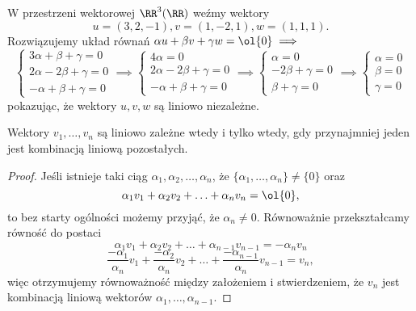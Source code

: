 \begin{example}
    W przestrzeni wektorowej $\RR^3(\RR)$ weźmy wektory
    $$ u = (3, 2, -1), v = (1, -2, 1), w = (1, 1, 1). $$
    Rozwiązujemy układ równań $\alpha u + \beta v + \gamma w = \ol{0} \implies$
    \begin{equation*}
        \begin{cases}
            3\alpha + \beta + \gamma = 0 \\
            2\alpha - 2\beta + \gamma = 0 \\
            -\alpha + \beta + \gamma = 0
        \end{cases} \implies
        \begin{cases}
            4\alpha = 0 \\
            2\alpha - 2\beta + \gamma = 0 \\
            -\alpha + \beta + \gamma = 0
        \end{cases} \implies
        \begin{cases}
            \alpha = 0 \\
            - 2\beta + \gamma = 0 \\
            \beta + \gamma = 0
        \end{cases} \implies
        \begin{cases}
            \alpha = 0 \\
            \beta = 0 \\
            \gamma = 0
        \end{cases}
    \end{equation*}
    pokazując, że wektory $u, v, w$ są liniowo niezależne.
\end{example}

\begin{theorem}
    Wektory $v_1, \ldots, v_n$ są liniowo zależne wtedy i tylko wtedy, gdy przynajmniej jeden jest kombinacją liniową pozostałych.
\end{theorem}
\begin{proof}
    Jeśli istnieje taki ciąg $\alpha_1, \alpha_2, \ldots, \alpha_n$, że $\{\alpha_1, \ldots, \alpha_n\} \neq \{0\}$ oraz
    $$ \alpha_1v_1 + \alpha_2v_2 + \ldots + \alpha_nv_n = \ol{0}, $$
    to bez starty ogólności możemy przyjąć, że $\alpha_n \neq 0$. Równoważnie przekształcamy równość do postaci
    $$ \alpha_1v_1 + \alpha_2v_2 + \ldots + \alpha_{n-1}v_{n-1} = -\alpha_nv_n $$
    $$ \frac{-\alpha_1}{\alpha_n}v_1 + \frac{-\alpha_2}{\alpha_n}v_2 + \ldots + \frac{-\alpha_{n-1}}{\alpha_n}v_{n-1} = v_n, $$
    więc otrzymujemy równoważność między założeniem i stwierdzeniem, że $v_n$ jest kombinacją liniową wektorów $\alpha_1, \ldots, \alpha_{n-1}$.
\end{proof}

